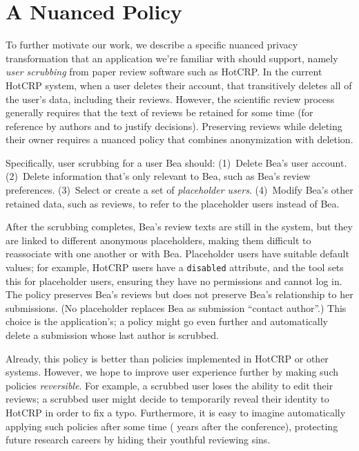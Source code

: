 \section{A Nuanced Policy}
\label{design:eg}


To further motivate our work, we describe a specific nuanced privacy
transformation that an application we're familiar with should support, namely
\emph{user scrubbing} from paper review software such as HotCRP.
%
In the current HotCRP system, when a user deletes their account, that
transitively deletes all of the user's data, including their reviews.
%
However, the scientific review process generally requires that the text of
reviews be retained for some time (for reference by authors and to justify
decisions).
%
Preserving reviews while deleting their owner requires a nuanced policy
that combines anonymization with deletion.


Specifically, user scrubbing for a user Bea should:
%
(1)~Delete Bea's user account.
%
(2)~Delete information that's only relevant to Bea, such as Bea's review
preferences.
%
(3)~Select or create a set of \emph{placeholder users}.
%
(4)~Modify Bea's other retained data, such as reviews, to refer to the
placeholder users instead of Bea.


After the scrubbing completes, Bea's review texts are still in the system, but
they are linked to different anonymous placeholders, making them difficult to
reassociate with one another or with Bea.
%
Placeholder users have suitable default values; for example, HotCRP users have
a \texttt{disabled} attribute, and the tool sets this for placeholder users,
ensuring they have no permissions and cannot log in.
%
The policy preserves Bea's reviews but does not preserve Bea's relationship to
her submissions. (No placeholder replaces Bea as submission “contact author”.)
%
This choice is the application's; a policy might go even further and
automatically delete a submission whose last author is scrubbed.
%

Already, this policy is better than policies implemented in HotCRP or other systems.
%
However, we hope to improve user experience further by making such policies
\emph{reversible}.
%
For example, a scrubbed user loses the ability to edit their reviews; a
scrubbed user might decide to temporarily reveal their identity to HotCRP in
order to fix a typo.
%
Furthermore, it is easy to imagine automatically applying such policies
after some time ( years after the conference), protecting future
research careers by hiding their youthful reviewing sins.
%

